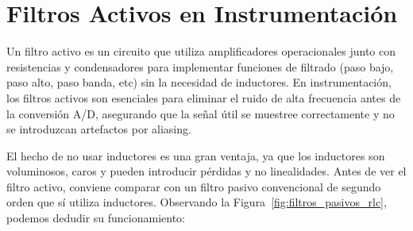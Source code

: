 \section{Filtros Activos en Instrumentación}\label{sec:filtros}


Un filtro activo es un circuito que utiliza amplificadores operacionales junto con resistencias y condensadores para implementar funciones de filtrado (paso bajo, paso alto, paso banda, etc) sin la necesidad de inductores. En instrumentación, los filtros activos son esenciales para eliminar el ruido de alta frecuencia antes de la conversión A/D, asegurando que la señal útil se muestree correctamente y no se introduzcan artefactos por aliasing.

El hecho de no usar inductores es una gran ventaja, ya que los inductores son voluminosos, caros y pueden introducir pérdidas y no linealidades. Antes de ver el filtro activo, conviene comparar con un filtro pasivo convencional de segundo orden que sí utiliza inductores. Observando la Figura~\ref{fig:filtros_pasivos_rlc}, podemos dedudir su funcionamiento:


\begin{marginfigure}
    \centering
    \shorthandoff{>}
    \vspace{1.5em}
    \caption[Filtros pasivos RLC paso bajo y paso alto.]{Filtros pasivos RLC: paso bajo (arriba) y paso alto (abajo).}\label{fig:filtros_pasivos_rlc}
\end{marginfigure}


